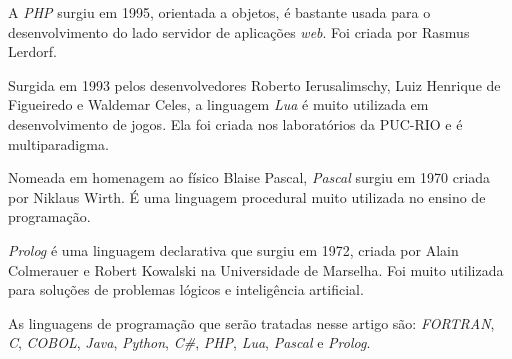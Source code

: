 \documentclass[conference]{IEEEtran}
\begin{document}
A \textit{PHP} surgiu em 1995, orientada a objetos, é bastante usada para o desenvolvimento do lado servidor de aplicações \textit{web}. Foi criada por Rasmus Lerdorf.

Surgida em 1993 pelos desenvolvedores Roberto Ierusalimschy, Luiz Henrique de Figueiredo e Waldemar Celes,  a linguagem \textit{Lua} é muito utilizada em desenvolvimento de jogos. Ela foi criada nos laboratórios da PUC-RIO e é multiparadigma.

Nomeada em homenagem ao físico Blaise Pascal, \textit{Pascal} surgiu em 1970 criada por Niklaus Wirth. É uma linguagem procedural muito utilizada no ensino de programação.

\textit{Prolog} é uma linguagem declarativa que surgiu em 1972, criada por Alain Colmerauer e Robert Kowalski na Universidade de Marselha. Foi muito utilizada para soluções de problemas lógicos e inteligência artificial.

As linguagens de programação que serão tratadas nesse artigo são: \textit{FORTRAN}, \textit{C}, \textit{COBOL}, \textit{Java}, \textit{Python}, \textit{C\#}, \textit{PHP}, \textit{Lua}, \textit{Pascal} e \textit{Prolog}.
\end{document}

